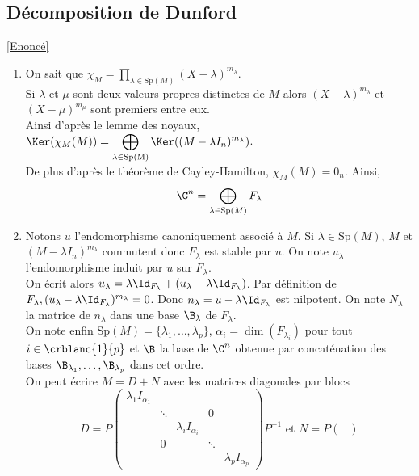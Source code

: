 \documentclass[8pt]{book}
\begin{document}
	\subsection{Décomposition de Dunford }
	\label{Décomposition de Dunford corrigé}
	\textcolor{blue}{\hyperref[Décomposition de Dunford]{[Enoncé]}}\\
	\begin{enumerate}
		\item On sait que $\chi_M=\displaystyle\prod_{\lambda\in \text{Sp}(M)}(X-\lambda)^{m_\lambda}$.\\
		Si $\lambda$ et $\mu$ sont deux valeurs propres distinctes de $M$ alors $(X-\lambda)^{m_\lambda}$ et $(X-\mu)^{m_\mu}$ sont premiers entre eux.\\
		Ainsi d'après le lemme des noyaux, $\Ker(\chi_M(M))=\displaystyle\bigoplus_{\lambda\in \text{Sp(M)}}\Ker((M-\lambda I_n)^{m_\lambda})$.\\
		De plus d'après le théorème de Cayley-Hamilton, $\chi_M(M)=0_n$. Ainsi,
		$$\C^n=\bigoplus_{\lambda\in \text{Sp}(M)}F_\lambda$$
		\item Notons $u$ l'endomorphisme canoniquement associé à $M$. Si $\lambda\in \text{Sp}(M)$, $M$ et $(M-\lambda I_n)^{m_\lambda}$ commutent donc $F_\lambda$ est stable par $u$. On note $u_\lambda$ l'endomorphisme induit par $u$ sur $F_\lambda$.\\
		On écrit alors $u_\lambda=\lambda\Id_{F_\lambda}+(u_\lambda-\lambda\Id_{F_\lambda})$. Par définition de $F_\lambda, (u_\lambda-\lambda\Id_{F_\lambda})^{m_\lambda}=0$. Donc $n_\lambda=u-\lambda\Id_{F_\lambda}$ est nilpotent. On note $N_\lambda$ la matrice de $n_\lambda$ dans une base $\B_\lambda$ de $F_\lambda$.\\
		On note enfin $\text{Sp}(M)=\{\lambda_1,\dots,\lambda_p\}$, $\alpha_i=\dim(F_{\lambda_i})$ pour tout $i\in \crblanc{1}{p}$ et $\B$ la base de $\C^n$ obtenue par concaténation des bases $\B_{\lambda_1},\dots,\B_{\lambda_p}$ dans cet ordre.\\
		On peut écrire $M=D+N$ avec les matrices diagonales par blocs $$D=P\begin{pmatrix}
			\lambda_1I_{\alpha_1}& & & & \\
			& \ddots & & 0 & \\
			& & \lambda_iI_{\alpha_i} & & \\
			& 0 & & \ddots & \\
			& & & & \lambda_pI_{\alpha_p}
		\end{pmatrix}P^{-1}\text{ et } N=P\begin{pmatrix}

\end{pmatrix}$$
\end{enumerate}
\end{document}
